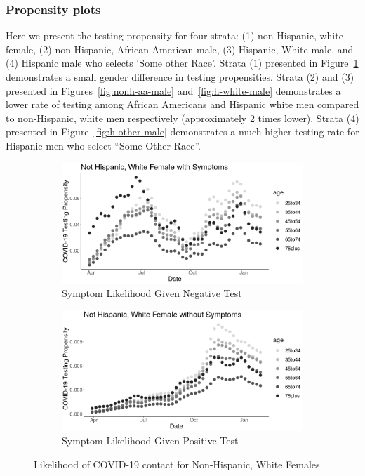 \documentclass[11pt]{amsart}
\numberwithin{equation}{section}
\theoremstyle{plain}
\begin{document}
\subsubsection{Propensity plots}
\label{section:propplots}

Here we present the testing propensity for four strata: (1) non-Hispanic, white female, (2) non-Hispanic, African American male, (3) Hispanic, White male, and (4) Hispanic male who selects `Some other Race'.   Strata (1) presented in Figure~\ref{fig:nonh-white-female} demonstrates a small gender difference in testing propensities.  Strata (2) and (3) presented in Figures~\ref{fig:nonh-aa-male} and~\ref{fig:h-white-male} demonstrates a lower rate of testing among African Americans and Hispanic white men compared to non-Hispanic, white men respectively (approximately 2 times lower). Strata (4) presented in Figure~\ref{fig:h-other-male} demonstrates a much higher testing rate for Hispanic men who select ``Some Other Race''.

\begin{figure}[!th]
\centering
\begin{subfigure}{.5\textwidth}
 \centering
 \includegraphics[width=.9\linewidth]{../figs/tvprop_alt_fig1_supp4.png}
 \caption{Symptom Likelihood Given Negative Test}
\end{subfigure}%
\begin{subfigure}{.5\textwidth}
 \centering
\includegraphics[width=.9\linewidth]{../figs/tvprop_alt_fig2_supp4.png}
 \caption{Symptom Likelihood Given Positive Test}
\end{subfigure}
\caption{Likelihood of COVID-19 contact for Non-Hispanic, White Females}
\label{fig:nonh-white-female}
\end{figure}
\end{document}
